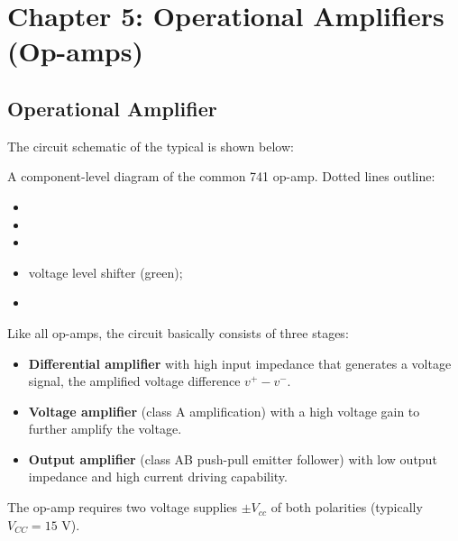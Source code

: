 \usepackage{html}
\textwidth 6.0in
\topmargin -0.5in
\oddsidemargin -0in
\evensidemargin -0.5in


\section*{Chapter 5: Operational Amplifiers (Op-amps)}

\subsection*{Operational Amplifier}

The circuit schematic of the typical 
 is shown below:



A component-level diagram of the common 741 op-amp. Dotted lines outline: 
\begin{itemize}
\item {}
\item {}
\item {}
\item voltage level shifter (green); 
\item {}
\end{itemize}


Like all op-amps, the circuit basically consists of three stages:
\begin{itemize}
\item {\bf Differential amplifier} with high input impedance that generates
  a voltage signal, the amplified voltage difference $v^+-v^-$.
\item {\bf Voltage amplifier} (class A amplification) with a high voltage gain 
  to further amplify the voltage.
\item {\bf Output amplifier} (class AB push-pull emitter follower) with low 
  output impedance and high current driving capability.
\end{itemize}
The op-amp requires two voltage supplies $\pm V_{cc}$ of both polarities (typically 
$V_{CC}=15$ V). 

